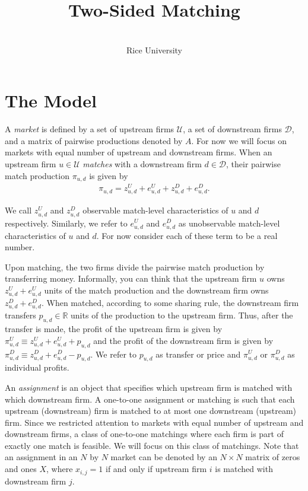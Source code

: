\documentclass[letterpaper,12pt]{article}
\title{Two-Sided Matching}
\author{\\
Rice University}
\date{}
\newcommand{\R}{\mathbb{R}}
\newcommand{\calu}{\mathcal{U}}
\newcommand{\cald}{\mathcal{D}}
\begin{document}
\maketitle

\section{The Model} 
A \emph{market} is defined by a set of upstream firms $\calu$, a set of downstream firms $\cald$, and a matrix of pairwise productions denoted by $A$. For now we will focus on markets with equal number of upstream and downstream firms. When an upstream firm $u\in \calu$ \emph{matches} with a downstream firm $d \in \cald$, their pairwise match production $\pi_{u,d}$ is given by 
\begin{align*}
  \pi_{u,d} = z_{u,d}^U + e_{u,d}^U + z_{u,d}^D + e_{u,d}^D. 
\end{align*}

We call $z_{u,d}^U$ and $z_{u,d}^D$ observable match-level characteristics of $u$ and $d$ respectively. Similarly, we refer to $e_{u,d}^U$ and $e_{u,d}^D$ as unobservable match-level characteristics of $u$ and $d$. For now consider each of these term to be a real number.  

Upon matching, the two firms divide the pairwise match production by transferring money. Informally, you can think that the upstream firm $u$ owns $z_{u,d}^U + e_{u,d}^U$ units of the match production and the downstream firm owns $z_{u,d}^D + e_{u,d}^D$. When matched, according to some sharing rule, the downstream firm transfers $p_{u,d} \in \R$ units of the production to the upstream firm. Thus, after the transfer is made, the profit of the upstream firm is given by $\pi_{u,d}^U \equiv z_{u,d}^U + e_{u,d}^U + p_{u,d}$ and the profit of the downstream firm is given by $\pi_{u,d}^D \equiv z_{u,d}^D + e_{u,d}^D - p_{u,d}$. We refer to $p_{u,d}$ as transfer or price and $\pi_{u,d}^U$ or $\pi_{u,d}^D$ as individual profits.

An \emph{assignment} is an object that specifies which upstream firm is matched with which downstream firm. A one-to-one assignment or matching is such that each upstream (downstream) firm is matched to at most one downstream (upstream) firm. Since we restricted attention to markets with equal number of upstream and downstream firms, a class of one-to-one matchings where each firm is part of exactly one match is feasible. We will focus on this class of matchings. Note that an assignment in an $N$ by $N$ market can be denoted by an $N \times N$ matrix of zeros and ones $X$, where $ x_{i,j} =1 $ if and only if upstream firm $i$ is matched with downstream firm $j$. 
\end{document}
